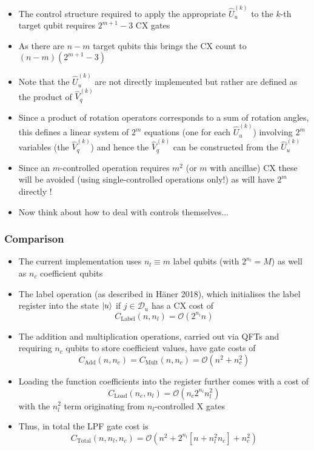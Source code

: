 \documentclass{beamer}
\begin{document}
\begin{frame}
\begin{itemize}
\item The control structure required to apply the appropriate $\hat{U}^{(k)}_u$ to the $k$-th target qubit requires $2^{m+1} -3$ CX gates 
\item As there are $n-m$ target qubits this brings the CX count to $(n-m) (2^{m+1}-3)$ 
\item Note that the $\hat{U}^{(k)}_u$ are not directly implemented but rather are defined as the product of $\hat{V}^{(k)}_q$
\item Since a product of rotation operators corresponds to a sum of rotation angles, this defines a linear system of $2^m$ equations (one for each $\hat{U}^{(k)}_u$) involving $2^m$ variables (the $\hat{V}^{(k)}_q$) and hence the $\hat{V}^{(k)}_q$ can be constructed from the $\hat{U}^{(k)}_u$   
\item Since an $m$-controlled operation requires $m^2$ (or $m$ with ancillae) CX these will be avoided (using single-controlled operations only!) as will have $2^m$ directly ! 
\item Now think about how to deal with controls themselves...
\end{itemize}
\end{frame}

\begin{frame}
\frametitle{Comparison}
\begin{itemize}
\item The current implementation uses $n_l \equiv m$ label qubits (with $2^{n_l} =M$) as well as $n_c$ coefficient qubits  
\item The label operation (as described in H\"aner 2018), which initialises the label register into the state $\ket{u}$ if $j \in \mathcal{D}_u$ has a CX cost of 
\begin{equation}
C_\text{Label}(n, n_l) = \mathcal{O}(2^{n_l} n)
\end{equation}
\item The addition and multiplication operations, carried out via QFTs and requiring $n_c$ qubits to store coefficient values, have  gate costs of 
\begin{equation}
C_\text{Add}(n, n_c) = C_\text{Mult}(n,n_c) = \mathcal{O}( n^2 + n_c^2)
\end{equation}
\item Loading the function coefficients into the register further comes with a cost of 
\begin{equation}
C_\text{Load}(n_c,n_l) = \mathcal{O}(n_c 2^{n_l} n_l^2)
\end{equation}
with the $n_l^2$ term originating from $n_l$-controlled X gates
\item Thus, in total the LPF gate cost is 
\begin{equation}
C_\text{Total} (n , n_l, n_c) = \mathcal{O}(n^2 + 2^{n_l} [n + n_l^2 n_c] + n_c^2)
\end{equation}
\end{itemize}
\end{frame}
\end{document}
